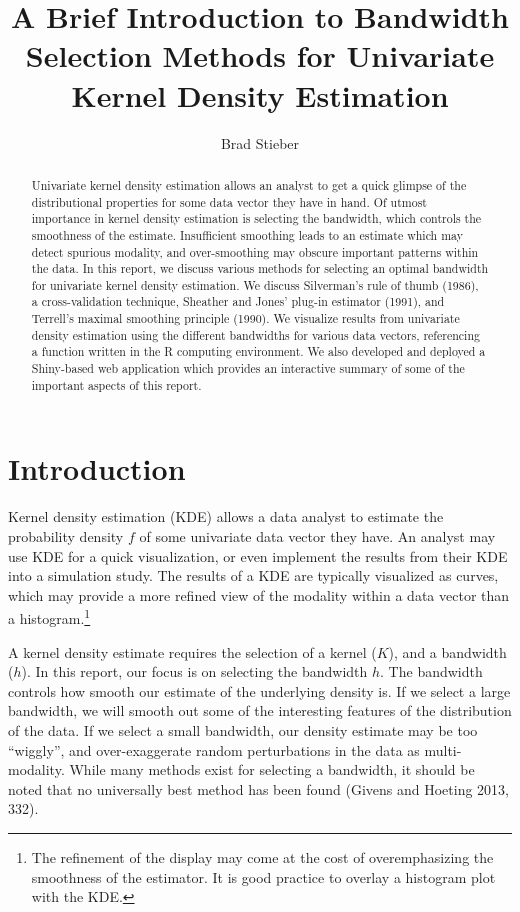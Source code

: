 \documentclass[]{article}
\title{A Brief Introduction to Bandwidth Selection Methods for Univariate
Kernel Density Estimation}
\author{Brad Stieber}
\date{}
\let\rmarkdownfootnote\footnote%
\def\footnote{\protect\rmarkdownfootnote}
\begin{document}
\maketitle
\begin{abstract}
Univariate kernel density estimation allows an analyst to get a quick
glimpse of the distributional properties for some data vector they have
in hand. Of utmost importance in kernel density estimation is selecting
the bandwidth, which controls the smoothness of the estimate.
Insufficient smoothing leads to an estimate which may detect spurious
modality, and over-smoothing may obscure important patterns within the
data. In this report, we discuss various methods for selecting an
optimal bandwidth for univariate kernel density estimation. We discuss
Silverman's rule of thumb (1986), a cross-validation technique, Sheather
and Jones' plug-in estimator (1991), and Terrell's maximal smoothing
principle (1990). We visualize results from univariate density
estimation using the different bandwidths for various data vectors,
referencing a function written in the R computing environment. We also
developed and deployed a Shiny-based web application which provides an
interactive summary of some of the important aspects of this report.
\end{abstract}

\section{Introduction}\label{introduction}

Kernel density estimation (KDE) allows a data analyst to estimate the
probability density \(f\) of some univariate data vector they have. An
analyst may use KDE for a quick visualization, or even implement the
results from their KDE into a simulation study. The results of a KDE are
typically visualized as curves, which may provide a more refined view of
the modality within a data vector than a histogram.\footnote{The
  refinement of the display may come at the cost of overemphasizing the
  smoothness of the estimator. It is good practice to overlay a
  histogram plot with the KDE.}

A kernel density estimate requires the selection of a kernel (\(K\)),
and a bandwidth (\(h\)). In this report, our focus is on selecting the
bandwidth \(h\). The bandwidth controls how smooth our estimate of the
underlying density is. If we select a large bandwidth, we will smooth
out some of the interesting features of the distribution of the data. If
we select a small bandwidth, our density estimate may be too ``wiggly'',
and over-exaggerate random perturbations in the data as multi-modality.
While many methods exist for selecting a bandwidth, it should be noted
that no universally best method has been found (Givens and Hoeting 2013,
332).
\end{document}

